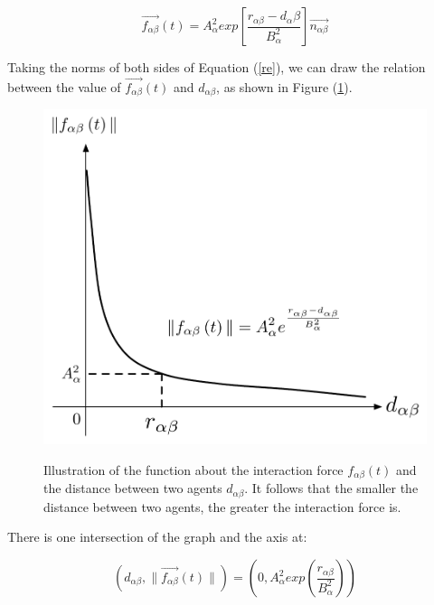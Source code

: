 \begin{equation}\label{re}
\overrightarrow{f_{\alpha\beta}}(t) = A_{\alpha}^{2} exp\left[ \frac{r_{\alpha\beta} - d_{\alpha}\beta}{B_{\alpha}^{2}}\right]  \overrightarrow{n_{\alpha\beta}}
\end{equation}

Taking the norms of both sides of Equation (\ref{re}), we can draw the relation between the value of $\overrightarrow{f_{\alpha\beta}}(t)$ and $ d_{\alpha\beta} $, as shown in Figure 
(\ref{physicalinteraction}).\\

\begin{figure}
    \centering
    {\includegraphics[scale=0.45]{Figures/physicalinteraction.pdf}} 
    \caption{Illustration of the function about the interaction force 
        $f_{\alpha\beta}(t)$ and the distance between two agents
        $d_{\alpha \beta}$. It follows that the smaller the distance between two agents, the greater the interaction force is. }
    \label{physicalinteraction}
\end{figure}

There is one intersection of the graph and the  axis at:

\begin{equation}
	\left( d_{\alpha \beta} , \| \vec{f_{\alpha \beta}} \left( t \right) \| \right)
 =
	\left( 0 , A_{\alpha}^{2} exp\left( \frac{r_{\alpha\beta} }{B_{\alpha}^{2}}\right)  \right) 
\end{equation}


